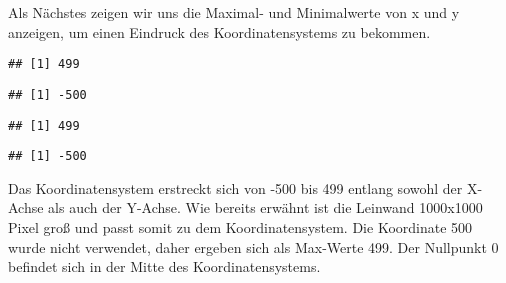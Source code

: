 \documentclass[
]{article}
\newenvironment{Shaded}{\begin{snugshade}}{\end{snugshade}}
\newcommand{\FunctionTok}[1]{\textcolor[rgb]{0.13,0.29,0.53}{\textbf{#1}}}
\newcommand{\NormalTok}[1]{#1}
\newcommand{\SpecialCharTok}[1]{\textcolor[rgb]{0.81,0.36,0.00}{\textbf{#1}}}
\begin{document}
Als Nächstes zeigen wir uns die Maximal- und Minimalwerte von x und y
anzeigen, um einen Eindruck des Koordinatensystems zu bekommen.

\begin{Shaded}
\end{Shaded}

\begin{verbatim}
## [1] 499
\end{verbatim}

\begin{Shaded}
\end{Shaded}

\begin{verbatim}
## [1] -500
\end{verbatim}

\begin{Shaded}
\end{Shaded}

\begin{verbatim}
## [1] 499
\end{verbatim}

\begin{Shaded}
\end{Shaded}

\begin{verbatim}
## [1] -500
\end{verbatim}

Das Koordinatensystem erstreckt sich von -500 bis 499 entlang sowohl der
X-Achse als auch der Y-Achse. Wie bereits erwähnt ist die Leinwand
1000x1000 Pixel groß und passt somit zu dem Koordinatensystem. Die
Koordinate 500 wurde nicht verwendet, daher ergeben sich als
Max-Werte 499. Der Nullpunkt 0 befindet sich in der
Mitte des Koordinatensystems.
\end{document}
